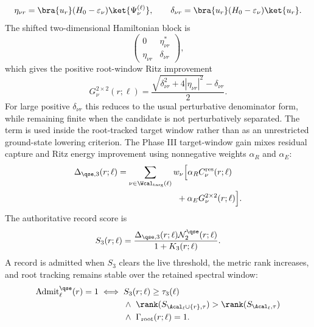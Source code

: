 \begin{equation}
\eta_{\nu r}
=
\bra{u_r}(H_0-\varepsilon_\nu)\ket{\Psi_\nu^{(\ell)}},
\qquad
\delta_{\nu r}
=
\bra{u_r}(H_0-\varepsilon_\nu)\ket{u_r}.
\label{eq:qse_ritz_parts}
\end{equation}
The shifted two-dimensional Hamiltonian block is
\begin{equation}
\begin{pmatrix}
0&\eta_{\nu r}^{*}\\
\eta_{\nu r}&\delta_{\nu r}
\end{pmatrix},
\end{equation}
which gives the positive root-window Ritz improvement
\begin{equation}
G_\nu^{2\times2}(r;\ell)
=
\frac{
\sqrt{\delta_{\nu r}^{2}+4|\eta_{\nu r}|^2}
-\delta_{\nu r}
}{2}.
\label{eq:qse_ritz_gain}
\end{equation}
For large positive \(\delta_{\nu r}\) this reduces to the usual perturbative denominator form, while remaining finite when the candidate is not perturbatively separated.  The term is used inside the root-tracked target window rather than as an unrestricted ground-state lowering criterion.  The Phase III target-window gain mixes residual capture and Ritz energy improvement using nonnegative weights $\alpha_R$ and $\alpha_E$:
\begin{equation}
\begin{aligned}
\Delta_{\qse,3}(r;\ell)
&=
\sum_{\nu\in\Wcal_{\rm targ}(\ell)}
w_\nu
\Bigl[
\alpha_R C_\nu^{\rm res}(r;\ell)
\\
&\hspace{7em}
+\alpha_E G_\nu^{2\times2}(r;\ell)
\Bigr].
\end{aligned}
\label{eq:qse_phase3_gain}
\end{equation}
The authoritative record score is
\begin{equation}
S_3(r;\ell)=
\frac{
\Delta_{\qse,3}(r;\ell)\mathcal N_2^{\qse}(r;\ell)
}{
1+K_3(r;\ell)
}.
\label{eq:qse_phase3_score}
\end{equation}
A record is admitted when \(S_3\) clears the live threshold, the metric rank increases, and root tracking remains stable over the retained spectral window:
\begin{equation}
\begin{aligned}
\operatorname{Admit}^{\qse}_\ell(r)=1
\iff{}&
S_3(r;\ell)\ge\tau_3(\ell)
\\
&\wedge\
\rank(S_{\Acal_\ell\cup\{r\},\tau})
>
\rank(S_{\Acal_\ell,\tau})
\\
&\wedge\
\Gamma_{\rm root}(r;\ell)=1 .
\end{aligned}
\label{eq:qse_admit}
\end{equation}

